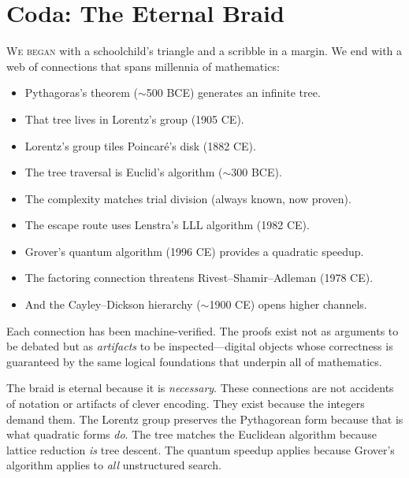 \documentclass[11pt,twoside,openright]{book}
\theoremstyle{definition}
\begin{document}

\chapter*{Coda: The Eternal Braid}

\lettrine[lines=3]{W}{e began} with a schoolchild's triangle and a
scribble in a margin. We end with a web of connections that spans
millennia of mathematics:

\begin{itemize}
\item Pythagoras's theorem ($\sim$500 BCE) generates an infinite tree.
\item That tree lives in Lorentz's group (1905 CE).
\item Lorentz's group tiles Poincar\'e's disk (1882 CE).
\item The tree traversal is Euclid's algorithm ($\sim$300 BCE).
\item The complexity matches trial division (always known, now proven).
\item The escape route uses Lenstra's LLL algorithm (1982 CE).
\item Grover's quantum algorithm (1996 CE) provides a quadratic speedup.
\item The factoring connection threatens Rivest--Shamir--Adleman (1978 CE).
\item And the Cayley--Dickson hierarchy ($\sim$1900 CE) opens higher channels.
\end{itemize}

Each connection has been machine-verified. The proofs exist not as
arguments to be debated but as \emph{artifacts} to be inspected---digital
objects whose correctness is guaranteed by the same logical foundations
that underpin all of mathematics.

\bigskip

The braid is eternal because it is \emph{necessary}. These connections
are not accidents of notation or artifacts of clever encoding. They exist
because the integers demand them. The Lorentz group preserves the
Pythagorean form because that is what quadratic forms \emph{do}. The tree
matches the Euclidean algorithm because lattice reduction \emph{is} tree
descent. The quantum speedup applies because Grover's algorithm applies
to \emph{all} unstructured search.
\end{document}
